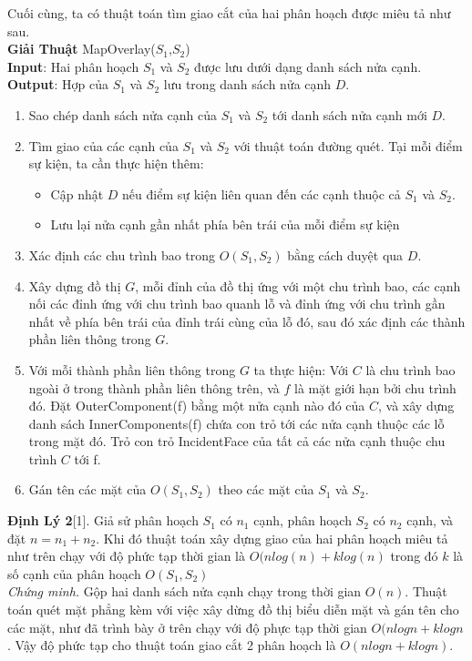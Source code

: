 \documentclass[15pt]{article}
\begin{document}
{Cuối cùng, ta có thuật toán tìm giao cắt của hai phân hoạch được miêu tả như sau. \\

\textbf{Giải Thuật} MapOverlay($S_1$,$S_2$) \\
\textbf{Input}: Hai phân hoạch $S_1$ và $S_2$ được lưu dưới dạng danh sách nửa cạnh. \\
\textbf{Output}: Hợp của $S_1$ và $S_2$ lưu trong danh sách nửa cạnh $D$.
\begin{enumerate}
    \item Sao chép danh sách nửa cạnh của $S_1$ và $S_2$ tới danh sách nửa cạnh mới $D$.
    \item Tìm giao của các cạnh của $S_1$ và $S_2$ với thuật toán đường quét. Tại mỗi điểm sự kiện, ta cần thực hiện thêm:
    \begin{itemize}
        \item Cập nhật $D$ nếu điểm sự kiện liên quan đến các cạnh thuộc cả $S_1$ và $S_2$.
        \item Lưu lại nửa cạnh gần nhất phía bên trái của mỗi điểm sự kiện
    \end{itemize}
    \item Xác định các chu trình bao trong $O(S_1, S_2)$ bằng cách duyệt qua $D$.
    \item Xây dựng đồ thị $G$, mỗi đỉnh của đồ thị ứng với một chu trình bao, các cạnh nối các đỉnh ứng với chu trình bao quanh lỗ và đỉnh ứng với chu trình gần nhất về phía bên trái của đỉnh trái cùng của lỗ đó, sau đó xác định các thành phần liên thông trong $G$.
    \item Với mỗi thành phần liên thông trong $G$ ta thực hiện:
Với $C$ là chu trình bao ngoài ở trong thành phần liên thông trên, và $f$ là mặt giới hạn bởi chu trình đó. Đặt OuterComponent(f) bằng một nửa cạnh nào đó của $C$, và xây dựng danh sách InnerComponents(f) chứa con trỏ tới các nửa cạnh thuộc các lỗ trong mặt đó. Trỏ con trỏ IncidentFace của tất cả các nửa cạnh thuộc chu trình $C$ tới f.
    \item Gán tên các mặt của $O(S_1, S_2)$ theo các mặt của $S_1$ và $S_2$.
\end{enumerate}
\textbf{Định Lý 2}[1]. Giả sử phân hoạch $S_1$ có $n_1$ cạnh, phân hoạch $S_2$ có $n_2$ cạnh, và đặt $n = n_1 + n_2$. Khi đó thuật toán xây dựng giao của hai phân hoạch miêu tả như trên chạy với độ phức tạp thời gian là $O(nlog(n) + klog(n)$ trong đó $k$ là số cạnh của phân hoạch $O(S_1,S_2)$\\
\textit{Chứng minh.} Gộp hai danh sách nửa cạnh chạy trong thời gian $O(n)$. Thuật toán quét mặt phẳng kèm với việc xây dừng đồ thị biểu diễn mặt và gán tên cho các mặt, như đã trình bày ở trên chạy với độ phực tạp thời gian $O(n log n + k log n$. Vậy độ phức tạp cho thuật toán giao cắt 2 phân hoạch là $O(n log n + k log n)$. \\

}
\end{document}
